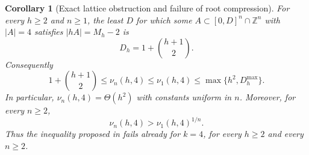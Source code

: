 \documentclass[11pt,reqno]{amsart}
\newtheorem{corollary}[theorem]{Corollary}
\theoremstyle{definition}
\theoremstyle{remark}
\newcommand{\Z}{\mathbb Z}
\begin{document}
\begin{corollary}[Exact lattice obstruction and failure of root compression]
\label{cor:defecttwolattice}
For every $h\geq2$ and $n\geq1$, the least $D$ for which some
$A\subset[0,D]^n\cap\Z^n$ with $|A|=4$ satisfies $|hA|=M_h-2$ is
\begin{equation}\label{eq:defecttwolatticediameter}
 D_h=1+\binom{h+1}{2}.
\end{equation}
Consequently
\begin{equation}\label{eq:latticecompressionbounds}
 1+\binom{h+1}{2}
 \leq\nu_n(h,4)\leq\nu_1(h,4)
 \leq\max\{h^2,D_h^{\max}\}.
\end{equation}
In particular, $\nu_n(h,4)=\Theta(h^2)$ with constants uniform in $n$.
Moreover, for every $n\geq2$,
\begin{equation}\label{eq:rootcompressionfails}
 \nu_n(h,4)>\nu_1(h,4)^{1/n}.
\end{equation}
Thus the inequality proposed in \cite[Problem~3]{NathansonLattice2026}
fails already for $k=4$, for every $h\geq2$ and every $n\geq2$.
\end{corollary}
\end{document}
